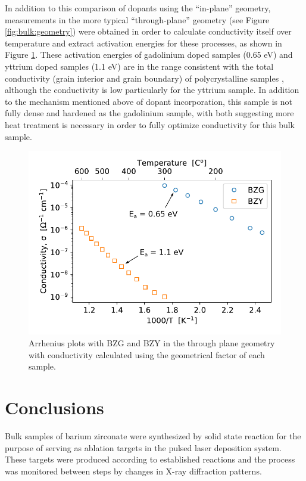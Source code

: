 In addition to this comparison of dopants using the ``in-plane'' geometry, measurements in the more typical ``through-plane'' geometry (see Figure \ref{fig:bulk:geometry}) were obtained in order to calculate conductivity itself over temperature and extract activation energies for these processes, as shown in Figure \ref{fig:bulk:arr:bzg_bzy}. These activation energies of gadolinium doped samples (0.65 eV) and yttrium doped samples (1.1 eV) are in the range consistent with the total conductivity (grain interior and grain boundary) of polycrystalline samples \cite{Gilardi2017}, although the conductivity is low particularly for the yttrium sample. In addition to the mechanism mentioned above of dopant incorporation, this sample is not fully dense and hardened as the gadolinium sample, with both suggesting more heat treatment is necessary in order to fully optimize conductivity for this bulk sample.
\begin{figure}
    \centering
    \includegraphics{Figures/190617-arr-bzg-bzy-thru-plane-air-edit.pdf}
    \caption{Arrhenius plots with BZG and BZY in the through plane geometry with conductivity calculated using the geometrical factor of each sample.}
    \label{fig:bulk:arr:bzg_bzy}
\end{figure}

\vspace{12pt}
\section{Conclusions}
Bulk samples of barium zirconate were synthesized by solid state reaction for the purpose of serving as ablation targets in the pulsed laser deposition system. These targets were produced according to established reactions and the process was monitored between steps by changes in X-ray diffraction patterns.

